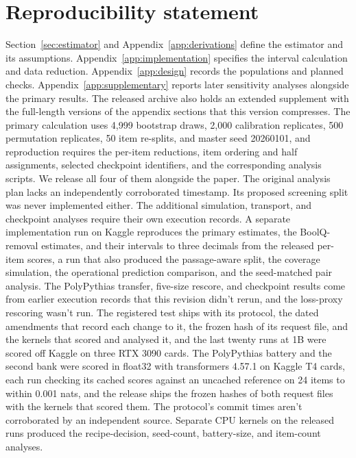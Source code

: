 \documentclass{article}
\begin{document}
\section*{Reproducibility statement}
Section~\ref{sec:estimator} and Appendix~\ref{app:derivations} define the estimator and its assumptions. Appendix~\ref{app:implementation} specifies the interval calculation and data reduction. Appendix~\ref{app:design} records the populations and planned checks. Appendix~\ref{app:supplementary} reports later sensitivity analyses alongside the primary results. The released archive also holds an extended supplement with the full-length versions of the appendix sections that this version compresses. The primary calculation uses 4,999 bootstrap draws, 2,000 calibration replicates, 500 permutation replicates, 50 item re-splits, and master seed 20260101, and reproduction requires the per-item reductions, item ordering and half assignments, selected checkpoint identifiers, and the corresponding analysis scripts. We release all four of them alongside the paper. The original analysis plan lacks an independently corroborated timestamp. Its proposed screening split was never implemented either. The additional simulation, transport, and checkpoint analyses require their own execution records. A separate implementation run on Kaggle reproduces the primary estimates, the BoolQ-removal estimates, and their intervals to three decimals from the released per-item scores, a run that also produced the passage-aware split, the coverage simulation, the operational prediction comparison, and the seed-matched pair analysis. The PolyPythias transfer, five-size rescore, and checkpoint results come from earlier execution records that this revision didn't rerun, and the loss-proxy rescoring wasn't run. The registered test ships with its protocol, the dated amendments that record each change to it, the frozen hash of its request file, and the kernels that scored and analysed it, and the last twenty runs at 1B were scored off Kaggle on three RTX 3090 cards. The PolyPythias battery and the second bank were scored in float32 with transformers 4.57.1 on Kaggle T4 cards, each run checking its cached scores against an uncached reference on 24 items to within 0.001 nats, and the release ships the frozen hashes of both request files with the kernels that scored them. The protocol's commit times aren't corroborated by an independent source. Separate CPU kernels on the released runs produced the recipe-decision, seed-count, battery-size, and item-count analyses.


\clearpage
\appendix


\end{document}
